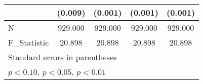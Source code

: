 {\begin{tabular}{l*{4}{c}}
            &     (0.009)         &     (0.001)         &     (0.001)         &     (0.001)         \\
\hline
N           &     929.000         &     929.000         &     929.000         &     929.000         \\
F\_Statistic &      20.898         &      20.898         &      20.898         &      20.898         \\
\hline\hline
\multicolumn{5}{l}{\footnotesize Standard errors in parentheses}\\
\multicolumn{5}{l}{\footnotesize \sym{*} \(p<0.10\), \sym{**} \(p<0.05\), \sym{***} \(p<0.01\)}\\
\end{tabular}
}
